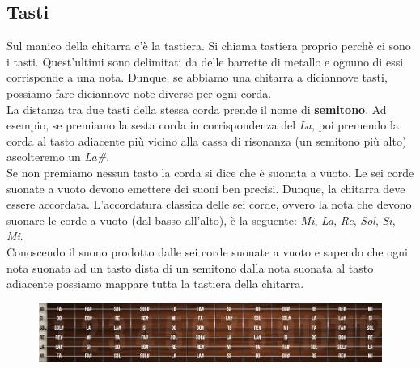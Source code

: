 \subsection{Tasti}
Sul manico della chitarra c’è la tastiera. Si chiama tastiera proprio perchè ci sono i tasti. Quest'ultimi sono delimitati da delle barrette di metallo e ognuno di essi corrisponde a una nota. Dunque, se abbiamo una chitarra a diciannove tasti, possiamo fare diciannove note diverse per ogni corda.\\
La distanza tra due tasti della stessa corda prende il nome di \textbf{semitono}. Ad esempio, se premiamo la sesta corda in corrispondenza del \textit{La}, poi premendo la corda al tasto adiacente più vicino alla cassa di risonanza (un semitono più alto) ascolteremo un \textit{La\#}.\\
Se non premiamo nessun tasto la corda si dice che è suonata a vuoto. Le sei corde suonate a vuoto devono emettere dei suoni ben precisi. Dunque, la chitarra deve essere accordata. L'accordatura classica delle sei corde, ovvero la nota che devono suonare le corde a vuoto (dal basso all'alto), è la seguente: \textit{Mi}, \textit{La}, \textit{Re}, \textit{Sol}, \textit{Si}, \textit{Mi}.\\
Conoscendo il suono prodotto dalle sei corde suonate a vuoto e sapendo che ogni nota suonata ad un tasto dista di un semitono dalla nota suonata al tasto adiacente possiamo mappare tutta la tastiera della chitarra.
\begin{figure}[H]
	\centering
	\includegraphics[scale=0.60]{./images/img13.jpg}
\end{figure}

